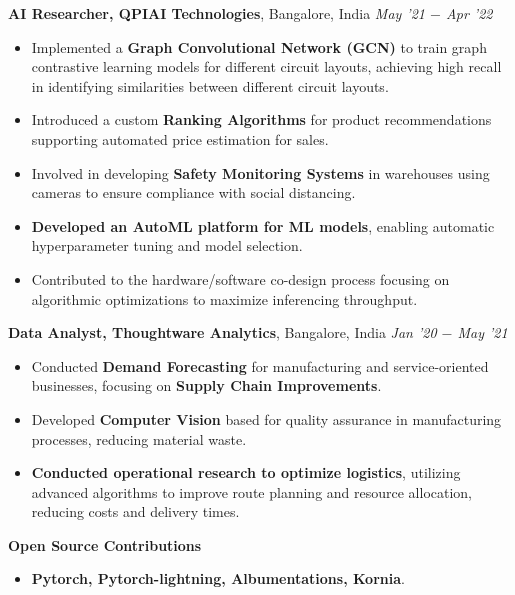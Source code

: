 \documentclass[10pt,a4]{article}
\begin{document}
{\begin{flushleft}
    \vspace{0.5mm}
    \hspace{1.5mm} \textbf{\large AI Researcher, QPIAI Technologies},  Bangalore, India \hfill \textit{\large May '21 $-$ Apr '22}	\\
    \begin{itemize}
        \item Implemented a \textbf{Graph Convolutional Network (GCN)} to train graph contrastive learning models for different circuit layouts, achieving high recall in identifying similarities between different circuit layouts.
        \item Introduced a custom \textbf{Ranking Algorithms} for product recommendations supporting automated price estimation for sales.
        \item Involved in developing \textbf{Safety Monitoring Systems} in warehouses using cameras to ensure compliance with social distancing.
        \item \textbf{Developed an AutoML platform for ML models}, enabling automatic hyperparameter tuning and model selection.
        \item Contributed to the hardware/software co-design process focusing on algorithmic optimizations to maximize inferencing throughput.
        
    \end{itemize}		

    \vspace{0.5mm}
    \hspace{1.5mm} \textbf{\large Data Analyst, Thoughtware Analytics},  Bangalore, India \hfill \textit{\large Jan '20 $-$ May '21}	\\		
    \begin{itemize}
          
        \item Conducted \textbf{Demand Forecasting} for manufacturing and service-oriented businesses, focusing on \textbf{Supply Chain Improvements}.
        \item Developed \textbf{Computer Vision} based for quality assurance in manufacturing processes, reducing material waste.  
        \item \textbf{Conducted operational research to optimize logistics}, utilizing advanced algorithms to improve route planning and resource allocation, reducing costs and delivery times.
    \end{itemize}

    \vspace{1.0mm}
    \hspace{1.5mm} \textbf{\large Open Source Contributions}
    \begin{itemize}
        \item \textbf{Pytorch, Pytorch-lightning, Albumentations, Kornia}.
    \end{itemize}
\end{flushleft}




}
\end{document}
